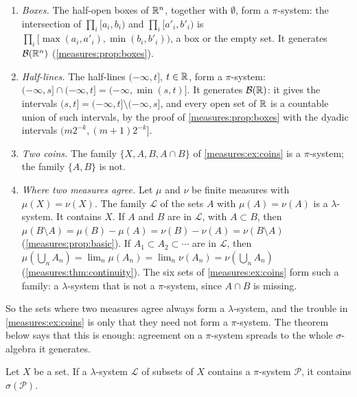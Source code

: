 \begin{notechapter}
\begin{example}
\label{measures:ex:pilambda}
\leavevmode
\begin{enumerate}[nosep]
  \item \emph{Boxes.} The half-open boxes of $\mathbb{R}^n$, together with
        $\emptyset$, form a $\pi$-system: the intersection of
        $\prod_i[a_i, b_i)$ and $\prod_i[a'_i, b'_i)$ is
        $\prod_i[\max(a_i, a'_i), \min(b_i, b'_i))$, a box or the empty
        set. It generates $\mathcal B(\mathbb{R}^n)$
        (\cref{measures:prop:boxes}).
  \item \emph{Half-lines.} The half-lines $(-\infty, t]$, $t\in\mathbb{R}$,
        form a $\pi$-system:
        $(-\infty, s]\cap(-\infty, t] = (-\infty, \min(s, t)]$. It
        generates $\mathcal B(\mathbb{R})$: it gives the intervals
        $(s, t] = (-\infty, t]\setminus(-\infty, s]$, and every open set
        of $\mathbb{R}$ is a countable union of such intervals, by the proof of
        \cref{measures:prop:boxes} with the dyadic intervals
        $(m2^{-k}, (m + 1)2^{-k}]$.
  \item \emph{Two coins.} The family $\{X, A, B, A\cap B\}$ of
        \cref{measures:ex:coins} is a $\pi$-system; the family
        $\{A, B\}$ is not.
  \item \emph{Where two measures agree.} Let $\mu$ and $\nu$ be finite
        measures with $\mu(X) = \nu(X)$. The family $\mathcal L$ of the
        sets $A$ with $\mu(A) = \nu(A)$ is a $\lambda$-system.
        It contains $X$. If $A$ and $B$ are in $\mathcal L$, with
        $A\subset B$, then
        $\mu(B\setminus A) = \mu(B) - \mu(A) = \nu(B) - \nu(A)
        = \nu(B\setminus A)$ (\cref{measures:prop:basic}). If
        $A_1\subset A_2\subset\cdots$ are in $\mathcal L$, then
        $\mu(\bigcup_nA_n) = \lim_n\mu(A_n) = \lim_n\nu(A_n)
        = \nu(\bigcup_nA_n)$ (\cref{measures:thm:continuity}). The six
        sets of \cref{measures:ex:coins} form such a family: a
        $\lambda$-system that is not a $\pi$-system, since $A\cap B$ is
        missing.
\end{enumerate}
\end{example}

So the sets where two measures agree always form a $\lambda$-system,
and the trouble in \cref{measures:ex:coins} is only that they need not
form a $\pi$-system. The theorem below says that this is enough:
agreement on a $\pi$-system spreads to the whole $\sigma$-algebra it
generates.

\begin{theorem}\label{measures:thm:pilambda}
Let $X$ be a set. If a $\lambda$-system $\mathcal L$ of subsets of $X$
contains a $\pi$-system $\mathcal P$, it contains $\sigma(\mathcal P)$.
\end{theorem}


\end{notechapter}
